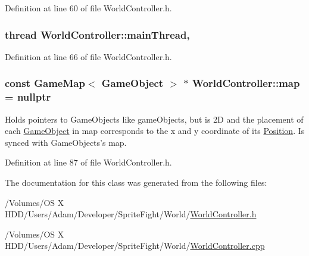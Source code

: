 Definition at line 60 of file World\-Controller.\-h.

\hypertarget{class_world_controller_a52eeb1fd93682db9e530ef43304ec5ef}{
\subsubsection[{main\-Thread}]{\setlength{\rightskip}{0pt plus 5cm}thread World\-Controller\-::main\-Thread\hspace{0.3cm}{\ttfamily [static]}, {\ttfamily [protected]}}}\label{class_world_controller_a52eeb1fd93682db9e530ef43304ec5ef}


Definition at line 66 of file World\-Controller.\-h.

\hypertarget{class_world_controller_a1970186c27a575110308f83e7268f375}{
\subsubsection[{map}]{\setlength{\rightskip}{0pt plus 5cm}const {\bf Game\-Map}$<$ {\bf Game\-Object} $>$ $\ast$ World\-Controller\-::map = nullptr\hspace{0.3cm}{\ttfamily [static]}}}\label{class_world_controller_a1970186c27a575110308f83e7268f375}
Holds pointers to Game\-Objects like game\-Objects, but is 2\-D and the placement of each \hyperlink{class_game_object}{Game\-Object} in map corresponds to the x and y coordinate of its \hyperlink{struct_position}{Position}. Is synced with Game\-Objects's map. 

Definition at line 87 of file World\-Controller.\-h.



The documentation for this class was generated from the following files\-:\begin{DoxyCompactItemize}
\item 
/\-Volumes/\-O\-S X H\-D\-D/\-Users/\-Adam/\-Developer/\-Sprite\-Fight/\-World/\hyperlink{_world_controller_8h}{World\-Controller.\-h}\item 
/\-Volumes/\-O\-S X H\-D\-D/\-Users/\-Adam/\-Developer/\-Sprite\-Fight/\-World/\hyperlink{_world_controller_8cpp}{World\-Controller.\-cpp}\end{DoxyCompactItemize}
